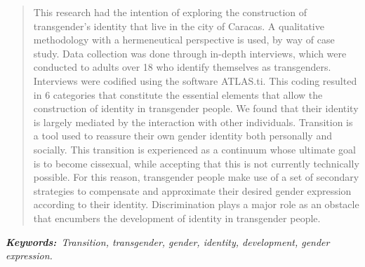 \begin{quote}
This research had the intention of exploring the construction of
transgender's identity that live in the city of Caracas. A qualitative
methodology with a hermeneutical perspective is used, by way of case
study. Data collection was done through in-depth interviews, which were
conducted to adults over 18 who identify themselves as
transgenders. Interviews were codified using the software ATLAS.ti\@. This
coding resulted in 6 categories that constitute the essential elements that
allow the construction of identity in transgender people. We found that their
identity is largely mediated by the interaction with other individuals.
Transition is a tool used to reassure their own gender identity both
personally and socially. This transition is experienced as a continuum whose
ultimate goal is to become cissexual, while accepting that this is not
currently technically possible. For this reason, transgender people make use
of a set of secondary strategies to compensate and approximate their desired
gender expression according to their identity. Discrimination plays a major
role as an obstacle that encumbers the development of identity in transgender
people.
\end{quote}

\itshape\textbf{Keywords:}\normalfont{}\ Transition, transgender,
gender, identity,  development, gender expression.
